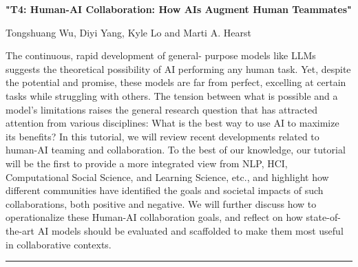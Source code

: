 \begin{center}
    \Large{\textbf{"T4: Human-AI Collaboration: How AIs Augment Human Teammates"}\\}
    \par\bigskip
    \large{Tongshuang Wu, Diyi Yang, Kyle Lo and Marti A. Hearst}\\
    \par\bigskip

\end{center}

The continuous, rapid development of general- purpose models like LLMs suggests the theoretical possibility of AI performing any human task. 
Yet, despite the potential and promise, these models are far from perfect, excelling at certain tasks while struggling with others. 
The tension between what is possible and a model's limitations raises the general research question that has attracted attention from various disciplines: What is the best way to use AI to maximize its benefits? In this tutorial, we will review recent developments related to human-AI teaming and collaboration. 
To the best of our knowledge, our tutorial will be the first to provide a more integrated view from NLP, HCI, Computational Social Science, and Learning Science, etc., and highlight how different communities have identified the goals and societal impacts of such collaborations, both positive and negative. We will further discuss how to operationalize these Human-AI collaboration goals, and reflect on how state-of-the-art AI models should be evaluated and scaffolded to make them most useful in collaborative contexts.
\begin{center}
    \noindent\rule{200px}{1pt}
\end{center}
